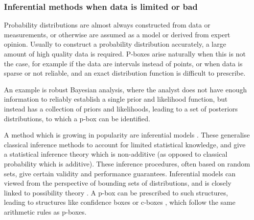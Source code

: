 \documentclass{juliacon}
\begin{document}
\subsubsection{Inferential methods when data is limited or bad}
Probability distributions are almost always constructed from data or measurements, or otherwise are assumed as a model or derived from expert opinion. Usually to construct a probability distribution accurately, a large amount of high quality data is required. P-boxes arise naturally when this is not the case, for example if the data are intervals instead of points, or when data is sparse or not reliable, and an exact distribution function is difficult to prescribe.

An example is robust Bayesian analysis, where the analyst does not have enough information to reliably establish a single prior and likelihood function, but instead has a collection of priors and likelihoods, leading to a set of posteriors distributions, to which a p-box can be identified.

A method which is growing in popularity are inferential models \cite{martin2015inferential}. These generalise classical inference methods to account for limited statistical knowledge, and give a statistical inference theory which is non-additive (as opposed to classical probability which is additive). These inference procedures, often based on random sets, give certain validity and performance guarantees. Inferential models can viewed from the perspective of bounding sets of distributions, and is closely linked to possibility theory \cite{liu2020inferential}. A p-box can be prescribed to such structures, leading to structures like confidence boxes or c-boxes \cite{fersoncomputing}, which follow the same arithmetic rules as p-boxes. 

\end{document}
